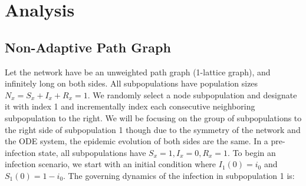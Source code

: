 % 

\section{Analysis}
\subsection{Non-Adaptive Path Graph}
\begin{center}
\end{center}
Let the network have be an unweighted path graph (1-lattice graph),  and infinitely long on both sides. All subpopulations have population sizes $N_x=S_x+I_x+R_x=1$. We randomly select a node subpopulation and designate it with index 1 and incrementally index each consecutive neighboring subpopulation to the right. We will be focusing on the group of subpopulations to the right side of subpopulation 1 though due to the symmetry of the network and the ODE system, the epidemic evolution of both sides are the same. In a pre-infection state, all subpopulations have $S_x=1,I_x=0,R_x=1$. To begin an infection scenario, we start with an initial condition where $I_1(0)=i_0$ and $S_1(0)=1-i_0$. 
The governing dynamics of the infection in subpopulation 1 is:

